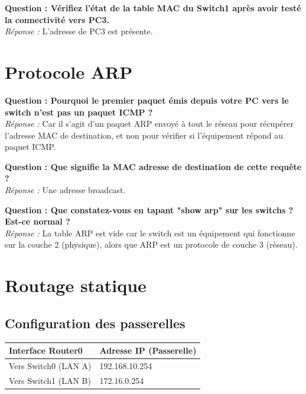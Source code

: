 \documentclass[a4paper,12pt]{article}
\begin{document}
\textbf{Question : Vérifiez l'état de la table MAC du Switch1 après avoir testé la connectivité vers PC3.} \\
\textit{Réponse :} L'adresse de PC3 est présente.
\vspace{1em}
\newpage
\section{Protocole ARP}

\textbf{Question : Pourquoi le premier paquet émis depuis votre PC vers le switch n'est pas un paquet ICMP ?} \\
\textit{Réponse :} Car il s'agit d'un paquet ARP envoyé à tout le réseau pour récupérer l'adresse MAC de destination, et non pour vérifier si l'équipement répond au paquet ICMP.
\vspace{1em}

\textbf{Question : Que signifie la MAC adresse de destination de cette requête ?} \\
\textit{Réponse :} Une adresse broadcast.
\vspace{1em}

\textbf{Question : Que constatez-vous en tapant "show arp" sur les switchs ? Est-ce normal ?} \\
\textit{Réponse :} La table ARP est vide car le switch est un équipement qui fonctionne sur la couche 2 (physique), alors que ARP est un protocole de couche 3 (réseau).
\vspace{1em}

\section{Routage statique}

\subsection{Configuration des passerelles}

\begin{center}
\begin{tabular}{ll}
\toprule
\textbf{Interface Router0} & \textbf{Adresse IP (Passerelle)} \\
\midrule
Vers Switch0 (LAN A) & 192.168.10.254 \\
Vers Switch1 (LAN B) & 172.16.0.254 \\
\bottomrule
\end{tabular}
\end{center}
\vspace{1em}
\end{document}
